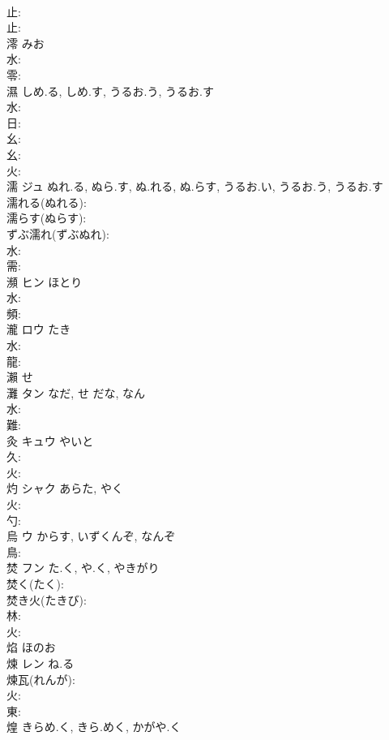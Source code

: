 \documentclass[8pt]{extreport}
\begin{document}
\begin{CJK}{UTF8}{min}
\\	止: 
\\	止: 
\\	澪		みお			
\\	水: 
\\	零: 
\\	濕		しめ.る, しめ.す, うるお.う, うるお.す				
\\	水: 
\\	日: 
\\	幺: 
\\	幺: 
\\	火: 
\\	濡	ジュ	ぬれ.る, ぬら.す, ぬ.れる, ぬ.らす, うるお.い, うるお.う, うるお.す		
\\	濡れる(ぬれる): 
\\	濡らす(ぬらす): 
\\	ずぶ濡れ(ずぶぬれ): 
\\	水: 
\\	需: 
\\	瀕	ヒン	ほとり		
\\	水: 
\\	頻: 
\\	瀧	ロウ	たき		
\\	水: 
\\	龍: 
\\	瀨		せ				
\\	灘	タン	なだ, せ	だな, なん	
\\	水: 
\\	難: 
\\	灸	キュウ	やいと		
\\	久: 
\\	火: 
\\	灼	シャク	あらた, やく		
\\	火: 
\\	勺: 
\\	烏	ウ	からす, いずくんぞ, なんぞ		
\\	鳥: 
\\	焚	フン	た.く, や.く, やきがり		
\\	焚く(たく): 
\\	焚き火(たきび): 
\\	林: 
\\	火: 
\\	焰		ほのお				
\\	煉	レン	ね.る		
\\	煉瓦(れんが): 
\\	火: 
\\	東: 
\\	煌		きらめ.く, きら.めく, かがや.く				

\end{CJK}
\end{document}
